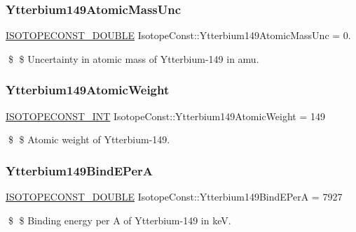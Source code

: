 \subsubsection{\texorpdfstring{Ytterbium149\+Atomic\+Mass\+Unc}{Ytterbium149AtomicMassUnc}}
{\footnotesize\ttfamily \mbox{\hyperlink{group___isotope_const-_macros_ga8f45a7272ce02c0b4c65c44636ed719a}{I\+S\+O\+T\+O\+P\+E\+C\+O\+N\+S\+T\+\_\+\+D\+O\+U\+B\+LE}} Isotope\+Const\+::\+Ytterbium149\+Atomic\+Mass\+Unc = 0.}

\$ \$ Uncertainty in atomic mass of Ytterbium-\/149 in amu. \mbox{\label{group___isotope_const-_ytterbium-_yb149_ga78a9811d68643d4b090b9e490411e0d4}} 
\subsubsection{\texorpdfstring{Ytterbium149\+Atomic\+Weight}{Ytterbium149AtomicWeight}}
{\footnotesize\ttfamily \mbox{\hyperlink{group___isotope_const-_macros_ga5f18360b3e99483a35c32d789e62621c}{I\+S\+O\+T\+O\+P\+E\+C\+O\+N\+S\+T\+\_\+\+I\+NT}} Isotope\+Const\+::\+Ytterbium149\+Atomic\+Weight = 149}

\$ \$ Atomic weight of Ytterbium-\/149. \mbox{\label{group___isotope_const-_ytterbium-_yb149_ga295a1c3682b6d1b2c1afffd02933dd93}} 
\subsubsection{\texorpdfstring{Ytterbium149\+Bind\+E\+PerA}{Ytterbium149BindEPerA}}
{\footnotesize\ttfamily \mbox{\hyperlink{group___isotope_const-_macros_ga8f45a7272ce02c0b4c65c44636ed719a}{I\+S\+O\+T\+O\+P\+E\+C\+O\+N\+S\+T\+\_\+\+D\+O\+U\+B\+LE}} Isotope\+Const\+::\+Ytterbium149\+Bind\+E\+PerA = 7927}

\$ \$ Binding energy per A of Ytterbium-\/149 in keV. \mbox{\label{group___isotope_const-_ytterbium-_yb149_gac7e7e6abb3329cff31038c62f136f63a}} 
